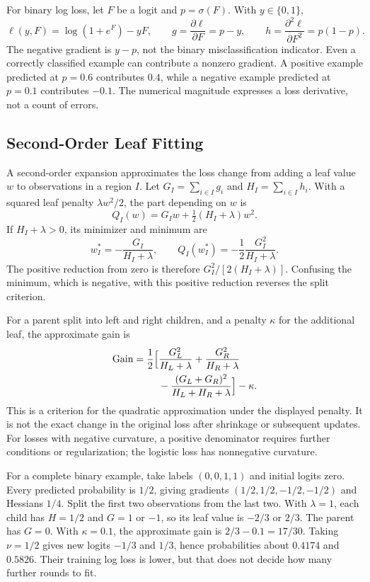 For binary log loss, let $F$ be a logit and $p=\sigma(F)$. With $y\in\{0,1\}$,
\[
\ell(y,F)=\log(1+e^F)-yF,
\qquad g=\frac{\partial\ell}{\partial F}=p-y,
\qquad h=\frac{\partial^2\ell}{\partial F^2}=p(1-p).
\]
The negative gradient is $y-p$, not the binary misclassification indicator. Even a correctly classified example can contribute a nonzero gradient. A positive example predicted at $p=0.6$ contributes $0.4$, while a negative example predicted at $p=0.1$ contributes $-0.1$. The numerical magnitude expresses a loss derivative, not a count of errors.

\subsection{Second-Order Leaf Fitting}

A second-order expansion approximates the loss change from adding a leaf value $w$ to observations in a region $I$. Let $G_I=\sum_{i\in I}g_i$ and $H_I=\sum_{i\in I}h_i$. With a squared leaf penalty $\lambda w^2/2$, the part depending on $w$ is
\[
Q_I(w)=G_Iw+\tfrac12(H_I+\lambda)w^2.
\]
If $H_I+\lambda>0$, its minimizer and minimum are
\[
w_I^*=-\frac{G_I}{H_I+\lambda},
\qquad Q_I(w_I^*)=-\frac12\frac{G_I^2}{H_I+\lambda}.
\]
The positive reduction from zero is therefore $G_I^2/[2(H_I+\lambda)]$. Confusing the minimum, which is negative, with this positive reduction reverses the split criterion.

For a parent split into left and right children, and a penalty $\kappa$ for the additional leaf, the approximate gain is \citep{chen2016xgboost}
\[
\begin{aligned}
\operatorname{Gain}=\frac12\Bigl[&\frac{G_L^2}{H_L+\lambda}
+\frac{G_R^2}{H_R+\lambda}\\
&-\frac{(G_L+G_R)^2}{H_L+H_R+\lambda}\Bigr]-\kappa.
\end{aligned}
\]
This is a criterion for the quadratic approximation under the displayed penalty. It is not the exact change in the original loss after shrinkage or subsequent updates. For losses with negative curvature, a positive denominator requires further conditions or regularization; the logistic loss has nonnegative curvature.

For a complete binary example, take labels $(0,0,1,1)$ and initial logits zero. Every predicted probability is $1/2$, giving gradients $(1/2,1/2,-1/2,-1/2)$ and Hessians $1/4$. Split the first two observations from the last two. With $\lambda=1$, each child has $H=1/2$ and $G=1$ or $-1$, so its leaf value is $-2/3$ or $2/3$. The parent has $G=0$. With $\kappa=0.1$, the approximate gain is $2/3-0.1=17/30$. Taking $\nu=1/2$ gives new logits $-1/3$ and $1/3$, hence probabilities about $0.4174$ and $0.5826$. Their training log loss is lower, but that does not decide how many further rounds to fit.

